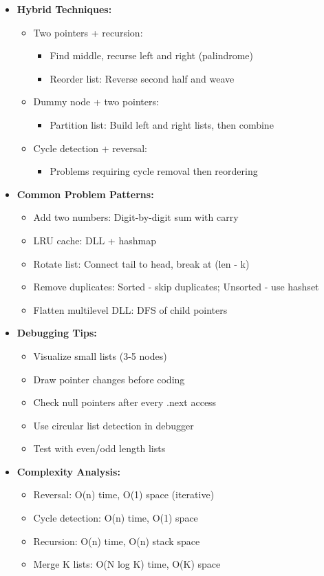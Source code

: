 \documentclass[a4paper,10pt]{book}
\begin{document}
\begin{itemize}
    \item \textbf{Hybrid Techniques:}
    \begin{itemize}
        \item Two pointers + recursion:
        \begin{itemize}
            \item Find middle, recurse left and right (palindrome)
            \item Reorder list: Reverse second half and weave
        \end{itemize}
        \item Dummy node + two pointers:
        \begin{itemize}
            \item Partition list: Build left and right lists, then combine
        \end{itemize}
        \item Cycle detection + reversal:
        \begin{itemize}
            \item Problems requiring cycle removal then reordering
        \end{itemize}
    \end{itemize}
    
    \item \textbf{Common Problem Patterns:}
    \begin{itemize}
        \item Add two numbers: Digit-by-digit sum with carry
        \item LRU cache: DLL + hashmap
        \item Rotate list: Connect tail to head, break at (len - k)
        \item Remove duplicates: Sorted - skip duplicates; Unsorted - use hashset
        \item Flatten multilevel DLL: DFS of child pointers
    \end{itemize}
    
    \item \textbf{Debugging Tips:}
    \begin{itemize}
        \item Visualize small lists (3-5 nodes)
        \item Draw pointer changes before coding
        \item Check null pointers after every .next access
        \item Use circular list detection in debugger
        \item Test with even/odd length lists
    \end{itemize}
    
    \item \textbf{Complexity Analysis:}
    \begin{itemize}
        \item Reversal: O(n) time, O(1) space (iterative)
        \item Cycle detection: O(n) time, O(1) space
        \item Recursion: O(n) time, O(n) stack space
        \item Merge K lists: O(N log K) time, O(K) space
    \end{itemize}
\end{itemize}
\end{document}
